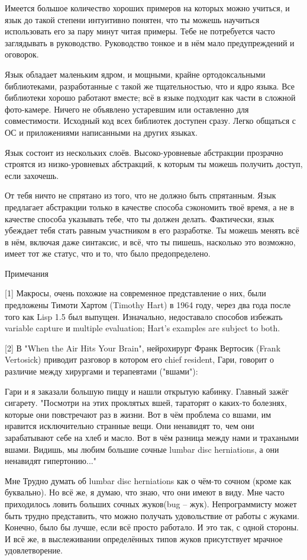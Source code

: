 \documentclass[ebook,12pt,oneside,openany]{memoir}
\begin{document}
Имеется большое количество хороших примеров на которых можно учиться,
и язык до такой степени интуитивно понятен, что ты можешь научиться
использовать его за пару минут читая примеры. Тебе не потребуется
часто заглядывать в руководство. Руководство тонкое и в нём мало
предупреждений и оговорок.

Язык обладает маленьким ядром, и мощными, крайне ортодоксальными
библиотеками, разработанные с такой же тщательностью, что и ядро
языка. Все библиотеки хорошо работают вместе; всё в языке подходит как
части в сложной фото-камере. Ничего не объявлено устаревшим или
оставленно для совместимости. Исходный код всех библиотек доступен
сразу. Легко общаться с ОС и приложениями написанными на других
языках.

Язык состоит из нескольких слоёв. Высоко-уровневые абстракции
прозрачно строятся из низко-уровневых абстракций, к которым ты можешь
получить доступ, если захочешь.

От тебя ничто не спрятано из того, что не должно быть спрятанным. Язык
предлагает абстракции только в качестве способа сэкономить твоё время,
а не в качестве способа указывать тебе, что ты должен делать.
Фактически, язык убеждает тебя стать равным участником в его
разработке. Ты можешь менять всё в нём, включая даже синтаксис, и всё,
что ты пишешь, насколько это возможно, имеет тот же статус, что и то,
что было предопределено.

Примечания

[1] Макросы, очень похожие на современное представление о них, были
предложены Тимоти Хартом (Timothy Hart) в 1964 году, через два года
после того как Lisp 1.5 был выпущен. Изначально, недоставало способов
избежать variable capture и multiple evaluation; Hart's examples are
subject to both.

[2] В "When the Air Hits Your Brain", нейрохирург Франк Вертосик
(Frank Vertosick) приводит разговор в котором его chief resident,
Гари, говорит о различие между хирургами и терапевтами ("вшами"):

Гари и я заказали большую пиццу и нашли открытую кабинку. Главный
зажёг сигарету. "Посмотри на этих проклятых вшей, тараторят о каких-то
болезнях, которые они повстречают раз в жизни. Вот в чём проблема со
вшами, им нравится исключительно странные вещи. Они ненавидят то, чем
они зарабатывают себе на хлеб и масло. Вот в чём разница между нами и
трахаными вшами. Видишь, мы любим большие сочные lumbar disc
herniations, а они ненавидят гипертонию..."

Мне Трудно думать об lumbar disc herniations как о чём-то сочном
(кроме как буквально). Но всё же, я думаю, что знаю, что они имеют в
виду. Мне часто приходилось ловить больших сочных жуков(bug -- жук).
Непрограммисту может быть трудно представить, что можно получать
удовольствие от работы с жуками. Конечно, было бы лучше, если всё
просто работало. И это так, с одной стороны. И всё же, в выслеживании
определённых типов жуков присутствует мрачное удовлетворение.
\end{document}
